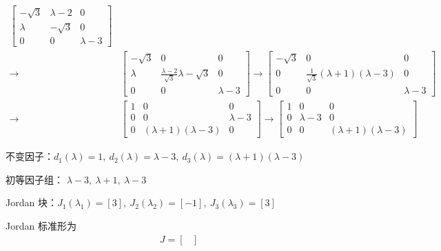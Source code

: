 \begin{solution}
\begin{enumerate}
\begin{enumerate}
\begin{align*}
\begin{bmatrix}
                                      -\sqrt{3} & \lambda - 2 & 0 \\ \lambda & -\sqrt{3} & 0 \\ 0 & 0 & \lambda - 3
                                \end{bmatrix} \\ \rightarrow& \begin{bmatrix}
                                    -\sqrt{3} & 0 & 0 \\ \lambda & \frac{\lambda - 2}{\sqrt{3}}\lambda-\sqrt{3} & 0 \\ 0 & 0 & \lambda - 3
                                \end{bmatrix} \rightarrow \begin{bmatrix}
                                    -\sqrt{3} & 0 & 0 \\ 0 & \frac{1}{\sqrt{3}}(\lambda + 1)(\lambda - 3) & 0 \\ 0 & 0 & \lambda - 3
                                \end{bmatrix} \\ \rightarrow& \begin{bmatrix}
                                    1 & 0 & 0 \\ 0 & 0 & \lambda - 3 \\ 0 & (\lambda + 1)(\lambda - 3) & 0
                                \end{bmatrix} \rightarrow \begin{bmatrix}
                                    1 & 0 & 0 \\ 0 & \lambda - 3 & 0 \\ 0 & 0 & (\lambda + 1)(\lambda - 3)
                                \end{bmatrix}
                            \end{align*}
                            \par 不变因子：$d_1(\lambda) = 1, \ d_2(\lambda) = \lambda - 3, \ d_3(\lambda) = (\lambda + 1)(\lambda - 3)$
                            \par 初等因子组： $\lambda - 3, \ \lambda + 1, \ \lambda - 3$
                            \par Jordan 块：$J_1(\lambda_1) = [3], \ J_2(\lambda_2) = [-1], \ J_3(\lambda_3) = [3]$
                            \par Jordan 标准形为 
                            \begin{align*}
                                J = \begin{bmatrix}

\end{bmatrix}
\end{align*}
\end{enumerate}
\end{enumerate}
\end{solution}
